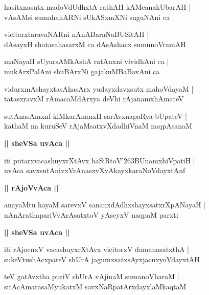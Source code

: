 \documentclass[twoside,12pt,openright]{book}
\def\S{\char'263}
\newcounter{shloka}[chapter]
\def\uvaca#1{\centerline{{\large\textbf{#1}}}}
\begin{document}
\begin{shloka}%
hasitxnasutx madoVdUdhxtA rathAH kAMcanakUbarAH |\\
vAsAMsi sumahahARNi sUkASxmXNi suguNAni ca 
\end{shloka}

\begin{shloka}%
vicitarxtaravaNARni nAnABaraNaBUSitAH |\\
dAsayxH shatasahasarxM ca dAsAshacx sumunoVramAH 
\end{shloka}

\begin{shloka}%
maNayaH sUyarsAMkAshA ratAnxni vividhAni ca |\\
mukArxPalAni shuBArxNi gajakuMBaBavAni ca 
\end{shloka}

\begin{shloka}%
vidurxmAshayxtasAhasArx yudayxdavxsutx mahoVdayaM |\\
tatasxravxM rAmacaMdArxya deVhi rAjanamxhAmateV
\end{shloka}

\begin{shloka}%
sutAnasAmxnf kiMkarAnanxH sarAvxnapaRya bUpateV |\\
kathaM na kuruSeV rAjaMsatxvXdadhiVnaM naqpAsanaM 
\end{shloka}

\uvaca{|| sheVSa uvAca ||}

\begin{shloka}%
iti putarxvacashuyxrXtAvx haSiRtoV\S BUnamxhiVpatiH |\\
uvAca savxsutAnivxVrAnasxvXvAkayxkaraNoVdayxtAnf 
\end{shloka}

\uvaca{|| rAjoVvAca ||}

\begin{shloka}%
anayaMtu hayaM sarevxV sananxdAdhxshayxsatxrXpANayaH |\\
nAnArathapariVvArAsatxtoV yAseyxV naqpaM parxti
\end{shloka}

\uvaca{|| sheVSa uvAca ||}

\begin{shloka}%
iti rAjocnxV vacashuyxrXtAvx vicitorxV damanasatxthA |\\
sukeVtushAcxpareV shUrA jagumxsatxsAyxjacnxyoVdayxtAH 
\end{shloka}

\begin{shloka}%
teV gatAvxtha puriV shUrA vAjinaM sumanoVharaM |\\
sitAcAmarasaMyukatxM savxNaRpatArxdayxlaMkaqtaM 
\end{shloka}
\end{document}
